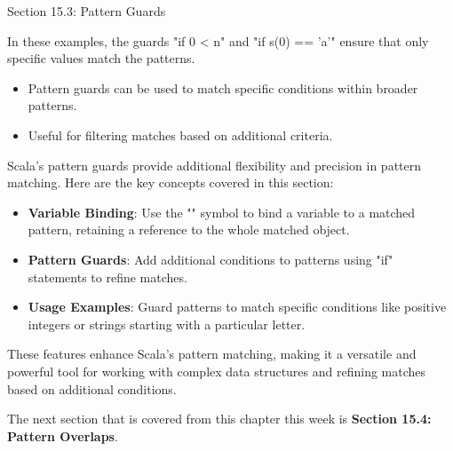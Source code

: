 \begin{notes}{Section 15.3: Pattern Guards}
\begin{highlight}
        In these examples, the guards "if 0 < n" and "if s(0) == 'a'" ensure that only specific values match the patterns.
    
        \begin{itemize}
            \item Pattern guards can be used to match specific conditions within broader patterns.
            \item Useful for filtering matches based on additional criteria.
        \end{itemize}
    
    \end{highlight}
    
    \begin{highlight}
    
        Scala's pattern guards provide additional flexibility and precision in pattern matching. Here are the key concepts covered in this section:
    
        \begin{itemize}
            \item \textbf{Variable Binding}: Use the "\@" symbol to bind a variable to a matched pattern, retaining a reference to the whole matched object.
            \item \textbf{Pattern Guards}: Add additional conditions to patterns using "if" statements to refine matches.
            \item \textbf{Usage Examples}: Guard patterns to match specific conditions like positive integers or strings starting with a particular letter.
        \end{itemize}
    
        These features enhance Scala's pattern matching, making it a versatile and powerful tool for working with complex data structures and refining matches based on additional conditions.
    
    \end{highlight}
\end{notes}

The next section that is covered from this chapter this week is \textbf{Section 15.4: Pattern Overlaps}.

